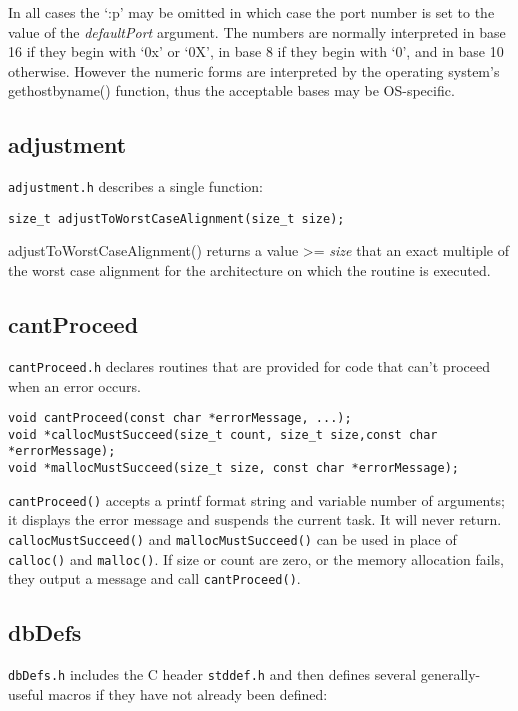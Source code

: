 In all cases the `:p' may be omitted in which case the port number is set to the value of the \emph{defaultPort} argument.
The numbers are normally interpreted in base 16 if they begin with `0x' or `0X', in base 8 if they begin with `0', and in base 10 otherwise.
However the numeric forms are interpreted by the operating system's gethostbyname() function, thus the acceptable bases may be OS-specific.

\subsection{adjustment}

\verb|adjustment.h| describes a single function:

\begin{verbatim}
size_t adjustToWorstCaseAlignment(size_t size);
\end{verbatim}

adjustToWorstCaseAlignment() returns a value \textgreater{}= \emph{size} that an exact multiple of the worst case alignment for the architecture on which the routine is executed.

\subsection{cantProceed}

\verb|cantProceed.h| declares routines that are provided for code that can't proceed when an error occurs.

\begin{verbatim}
void cantProceed(const char *errorMessage, ...);
void *callocMustSucceed(size_t count, size_t size,const char *errorMessage);
void *mallocMustSucceed(size_t size, const char *errorMessage);
\end{verbatim}

\verb|cantProceed()| accepts a printf format string and variable number of arguments; it displays the error message and suspends the current task.
It will never return.
\verb|callocMustSucceed()| and \verb|mallocMustSucceed()| can be used in place of \verb|calloc()| and \verb|malloc()|.
If size or count are zero, or the memory allocation fails, they output a message and call \verb|cantProceed()|.

\subsection{dbDefs}
\verb|dbDefs.h| includes the C header \verb|stddef.h| and then defines several generally-useful macros if they have not already been defined:

